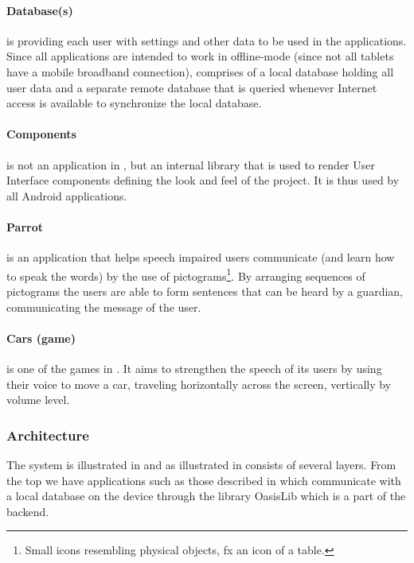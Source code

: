 \paragraph{Database(s)}
is providing each user with settings and other data to be used in the \giraf applications.
Since all applications are intended to work in offline-mode (since not all tablets have a mobile broadband connection), \giraf comprises of a local database holding all user data and a separate remote database that is queried whenever Internet access is available to synchronize the local database. 

\paragraph{\giraf Components}
is not an application in \giraf, but an internal library that is used to render User Interface components defining the look and feel of the project.
It is thus used by all Android applications.

\paragraph{Parrot}
is an application that helps speech impaired users communicate (and learn how to speak the words) by the use of pictograms\footnote{Small icons resembling physical objects, fx an icon of a table.}.
By arranging sequences of pictograms the users are able to form sentences that can be heard by a guardian, communicating the message of the user.

\paragraph{Cars (game)}
is one of the games in \giraf.
It aims to strengthen the speech of its users by using their voice to move a car, traveling horizontally across the screen, vertically by volume level.


\subsubsection{Architecture}
The \giraf system is illustrated in  and as illustrated in consists of several layers. From the top we have applications such as those described in  which communicate with a local database on the device through the library OasisLib which is a part of the \giraf backend.

